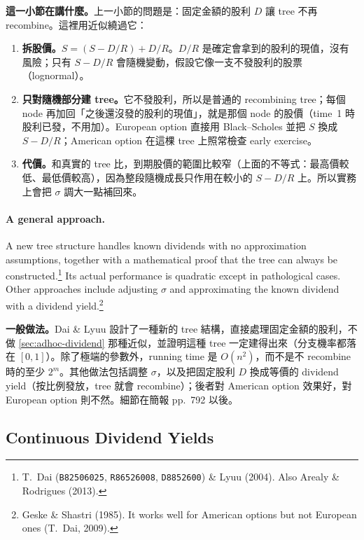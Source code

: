 \suppstart
\begin{remark}
	\textbf{這一小節在講什麼。}上一小節的問題是：固定金額的股利 $D$ 讓 tree 不再 recombine。這裡用近似繞過它：
	\begin{enumerate}[(1),nosep]
		\item \textbf{拆股價。}$S=(S-D/R)+D/R$。$D/R$ 是確定會拿到的股利的現值，沒有風險；只有 $S-D/R$ 會隨機變動，假設它像一支不發股利的股票（lognormal）。
		\item \textbf{只對隨機部分建 tree。}它不發股利，所以是普通的 recombining tree；每個 node 再加回「之後還沒發的股利的現值」，就是那個 node 的股價（time~1 時股利已發，不用加）。European option 直接用 Black--Scholes 並把 $S$ 換成 $S-D/R$；American option 在這棵 tree 上照常檢查 early exercise。
		\item \textbf{代價。}和真實的 tree 比，到期股價的範圍比較窄（上面的不等式：最高價較低、最低價較高），因為整段隨機成長只作用在較小的 $S-D/R$ 上。所以實務上會把 $\sigma$ 調大一點補回來。
	\end{enumerate}
\end{remark}
\suppend

\paragraph{A general approach.}
A new tree structure handles known dividends with no approximation assumptions, together with a mathematical proof that the tree can always be constructed.\footnote{T.~Dai (\texttt{B82506025}, \texttt{R86526008}, \texttt{D8852600}) \& Lyuu (2004). Also Arealy \& Rodrigues (2013).}
Its actual performance is quadratic except in pathological cases.
Other approaches include adjusting $\sigma$ and approximating the known dividend with a dividend yield.\footnote{Geske \& Shastri (1985). It works well for American options but not European ones (T.~Dai, 2009).}

\suppstart
\begin{remark}
	\textbf{一般做法。}Dai \& Lyuu 設計了一種新的 tree 結構，直接處理固定金額的股利，不做 \autoref{sec:adhoc-dividend} 那種近似，並證明這種 tree 一定建得出來（分支機率都落在 $[0,1]$）。除了極端的參數外，running time 是 $O(n^{2})$，而不是不 recombine 時的至少 $2^{m}$。其他做法包括調整 $\sigma$，以及把固定股利 $D$ 換成等價的 dividend yield（按比例發放，tree 就會 recombine）；後者對 American option 效果好，對 European option 則不然。細節在簡報 pp.~792 以後。
\end{remark}
\suppend

\subsection{Continuous Dividend Yields}
\label{sec:continuous-yield}


